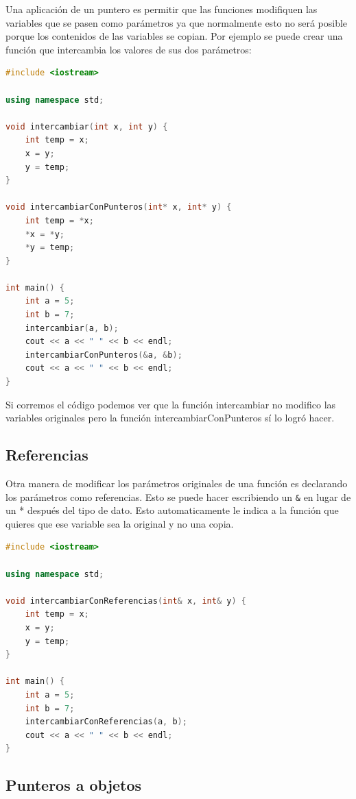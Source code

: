 \documentclass{article}
\begin{document}
Una aplicación de un puntero es permitir que las funciones modifiquen las variables que se pasen como parámetros ya que normalmente esto no será posible porque los contenidos de las variables se copian. Por ejemplo se puede crear una función que intercambia los valores de sus dos parámetros:

\begin{lstlisting}[language=C++, title=Funciones con punteros]
#include <iostream>

using namespace std;

void intercambiar(int x, int y) {
	int temp = x;
	x = y;
	y = temp;
}

void intercambiarConPunteros(int* x, int* y) {
	int temp = *x;
	*x = *y;
	*y = temp;
}

int main() {
	int a = 5;
	int b = 7;
	intercambiar(a, b);
	cout << a << " " << b << endl;
	intercambiarConPunteros(&a, &b);
	cout << a << " " << b << endl;
}
\end{lstlisting}

Si corremos el código podemos ver que la función intercambiar no modifico las variables originales pero la función intercambiarConPunteros sí lo logró hacer.

\subsection{Referencias}

Otra manera de modificar los parámetros originales de una función es declarando los parámetros como referencias. Esto se puede hacer escribiendo un \lstinline{&} en lugar de un * después del tipo de dato. Esto automaticamente le indica a la función que quieres que ese variable sea la original y no una copia.

\begin{lstlisting}[language=C++, title=Funciones con referencias]
#include <iostream>

using namespace std;

void intercambiarConReferencias(int& x, int& y) {
	int temp = x;
	x = y;
	y = temp;
}

int main() {
	int a = 5;
	int b = 7;
	intercambiarConReferencias(a, b);
	cout << a << " " << b << endl;
}
\end{lstlisting}

\subsection{Punteros a objetos}
\end{document}

